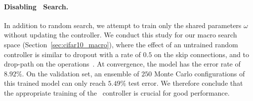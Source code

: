 \paragraph{Disabling \enas~Search.} In addition to random search, we attempt to train only the shared parameters $\omega$ without updating the controller. We conduct this study for our macro search space (Section~\ref{sec:cifar10_macro}), where the effect of an untrained random controller is similar to dropout with a rate of $0.5$ on the skip connections, and to drop-path on the operations~\citep{nas_module,fractal_net}. At convergence, the model has the error rate of $8.92\%$. On the validation set, an ensemble of $250$ Monte Carlo configurations of this trained model can only reach $5.49\%$ test error. We therefore conclude that the appropriate training of the \enas~controller is crucial for good performance.

